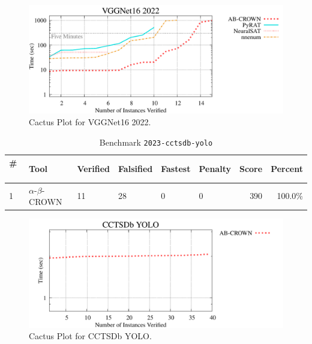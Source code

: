 \begin{figure}[h]
\centerline{\includegraphics[width=\textwidth]{cactus/2022_vggnet16_2022.pdf}}
\caption{Cactus Plot for VGGNet16 2022.}
\label{fig:quantPic}
\end{figure}



\begin{table}[h]
\begin{center}
\caption{Benchmark \texttt{2023-cctsdb-yolo}} \label{tab:cat_{cat}}
{\setlength{\tabcolsep}{2pt}
\begin{tabular}[h]{@{}llllllrr@{}}
\toprule
\textbf{\# ~} & \textbf{Tool} & \textbf{Verified} & \textbf{Falsified} & \textbf{Fastest} & \textbf{Penalty} & \textbf{Score} & \textbf{Percent}\\
\midrule
1 & $\alpha$-$\beta$-CROWN & 11 & 28 & 0 & 0 & 390 & 100.0\% \\
\bottomrule
\end{tabular}
}
\end{center}
\end{table}



\begin{figure}[h]
\centerline{\includegraphics[width=\textwidth]{cactus/2023_cctsdb_yolo.pdf}}
\caption{Cactus Plot for CCTSDb YOLO.}
\label{fig:quantPic}
\end{figure}


